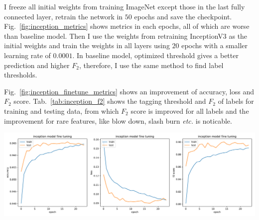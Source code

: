 \documentclass[11pt,oneside,a4paper]{article}
\newenvironment{Figure}
{\par\medskip\noindent\minipage{\linewidth}}
{\endminipage\par\medskip}
\begin{document}
I freeze all initial weights from training ImageNet except those in the last fully connected layer, retrain the network in $50$ epochs and save the checkpoint. Fig.~\ref{fig:inception_metrics} shows metrics in each epochs, all of which are worse than baseline model. Then I use the weights from retraining InceptionV3 as the initial weights and train the weights in all layers using $20$ epochs with a smaller learning rate of $0.0001$. In baseline model, optimized threshold gives a better prediction and higher $F_2$, therefore, I use the same method to find label thresholds.

Fig.~\ref{fig:inception_finetune_metrics} shows an improvement of accuracy, loss and $F_2$ score. Tab.~\ref{tab:inception_f2} shows the tagging threshold and $F_2$ of labels for training and testing data, from which $F_2$ score is improved for all labels and the improvement for rare features, like blow down, slash burn \emph{etc.} is noticable.

\begin{Figure}
 \centering
 \includegraphics[width=1.\linewidth, height=0.33\linewidth]{inception_finetune_metrics.pdf}
 \label{fig:inception_finetune_metrics}
\end{Figure}
\end{document}
